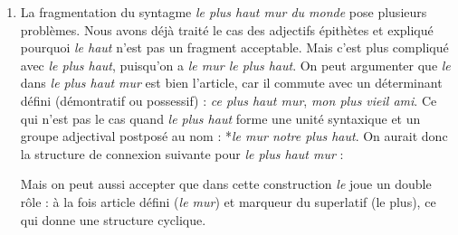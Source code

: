 {\begin{enumerate}[label=\alph*.]
\begin{center}
\end{center}


\item La fragmentation du syntagme \textit{le plus haut mur du monde} pose plusieurs problèmes. Nous avons déjà traité le cas des adjectifs épithètes et expliqué pourquoi \textit{le haut} n’est pas un fragment acceptable. Mais c’est plus compliqué avec \textit{le plus haut}, puisqu’on a \textit{le mur le plus haut}. On peut argumenter que \textit{le} dans \textit{le plus haut mur} est bien l’article, car il commute avec un déterminant défini (démontratif ou possessif) : \textit{ce plus haut mur}, \textit{mon plus vieil ami}. Ce qui n’est pas le cas quand \textit{le plus haut} forme une unité syntaxique et un groupe adjectival postposé au nom : *\textit{le mur notre plus haut}. On aurait donc la structure de connexion suivante pour \textit{le plus haut mur} :

\begin{center}
\end{center}

Mais on peut aussi accepter que dans cette construction \textit{le} joue un double rôle : à la fois article défini (\textit{le mur}) et marqueur du superlatif (le plus), ce qui donne une structure cyclique.

\begin{center}
\end{center}


\end{enumerate}}
